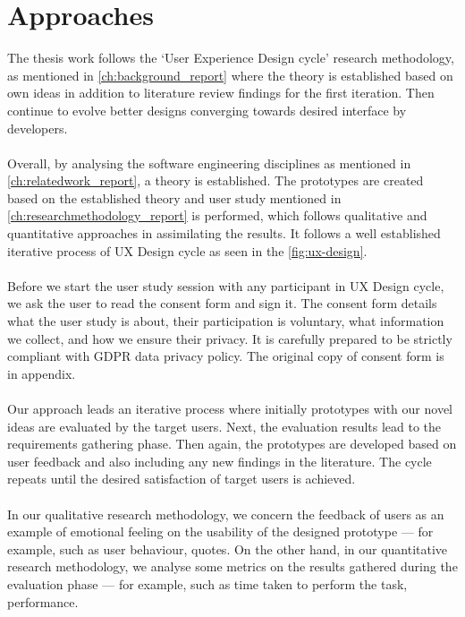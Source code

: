 \chapter{Approaches}
\label{ch:approaches_report}


The thesis work follows the ‘User Experience Design cycle’ research methodology, as mentioned in \autoref{ch:background_report} where the theory is established based on own ideas in addition to literature review findings for the first iteration. Then continue to evolve better designs converging towards desired interface by developers. \\ \\

Overall, by analysing the software engineering disciplines as mentioned in \autoref{ch:relatedwork_report}, a theory is established. The prototypes are created based on the established theory and user study mentioned in \autoref{ch:researchmethodology_report} is performed, which follows qualitative and quantitative approaches in assimilating the results. It follows a well established iterative process of UX Design cycle \cite{UX} as seen in the \autoref{fig:ux-design}. \\ \\

Before we start the user study session with any participant in UX Design cycle, we ask the user to read the consent form and sign it. The consent form details what the user study is about, their participation is voluntary, what information we collect, and how we ensure their privacy. It is carefully prepared to be strictly compliant with GDPR data privacy policy. \cite{gdpr} The original copy of consent form is in appendix. \\ \\

Our approach leads an iterative process where initially prototypes with our novel ideas are evaluated by the target users. Next, the evaluation results lead to the requirements gathering phase. Then again, the prototypes are developed based on user feedback and also including any new findings in the literature. The cycle repeats until the desired satisfaction of target users is achieved. \\ \\

In our qualitative research methodology, we concern the feedback of users as an example of emotional feeling on the usability of the designed prototype — for example, such as user behaviour, quotes. On the other hand, in our quantitative research methodology, we analyse some metrics on the results gathered during the evaluation phase — for example, such as time taken to perform the task, performance. \\ \\

